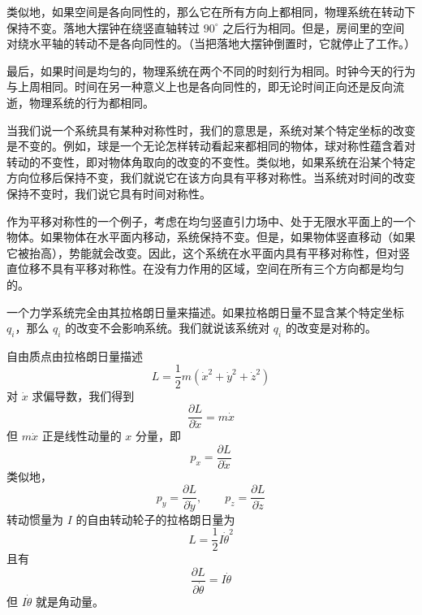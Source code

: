 类似地，如果空间是各向同性的，那么它在所有方向上都相同，物理系统在转动下保持不变。落地大摆钟在绕竖直轴转过 $90^\circ$ 之后行为相同。但是，房间里的空间对绕水平轴的转动不是各向同性的。（当把落地大摆钟倒置时，它就停止了工作。）

最后，如果时间是均匀的，物理系统在两个不同的时刻行为相同。时钟今天的行为与上周相同。时间在另一种意义上也是各向同性的，即无论时间正向还是反向流逝，物理系统的行为都相同。

当我们说一个系统具有某种对称性时，我们的意思是，系统对某个特定坐标的改变是不变的。例如，球是一个无论怎样转动看起来都相同的物体，球对称性蕴含着对转动的不变性，即对物体角取向的改变的不变性。类似地，如果系统在沿某个特定方向位移后保持不变，我们就说它在该方向具有平移对称性。当系统对时间的改变保持不变时，我们说它具有时间对称性。

作为平移对称性的一个例子，考虑在均匀竖直引力场中、处于无限水平面上的一个物体。如果物体在水平面内移动，系统保持不变。但是，如果物体竖直移动（如果它被抬高），势能就会改变。因此，这个系统在水平面内具有平移对称性，但对竖直位移不具有平移对称性。在没有力作用的区域，空间在所有三个方向都是均匀的。

一个力学系统完全由其拉格朗日量来描述。如果拉格朗日量不显含某个特定坐标 $q_i$，那么 $q_i$ 的改变不会影响系统。我们就说该系统对 $q_i$ 的改变是对称的。

自由质点由拉格朗日量描述
\begin{equation}\label{eq:1.Lfree}
L = \frac{1}{2}m(\dot{x}^2 + \dot{y}^2 + \dot{z}^2)
\end{equation}
对 $\dot{x}$ 求偏导数，我们得到
\begin{equation*}
\frac{\partial L}{\partial \dot{x}} = m\dot{x}
\end{equation*}
但 $m\dot{x}$ 正是线性动量的 $x$ 分量，即
\begin{equation*}
p_x = \frac{\partial L}{\partial \dot{x}}
\end{equation*}
类似地，
\begin{equation*}
p_y = \frac{\partial L}{\partial \dot{y}}, \qquad p_z = \frac{\partial L}{\partial \dot{z}}
\end{equation*}
转动惯量为 $I$ 的自由转动轮子的拉格朗日量为
\begin{equation*}
L = \frac{1}{2}I\dot{\theta}^2
\end{equation*}
且有
\begin{equation*}
\frac{\partial L}{\partial \dot{\theta}} = I\dot{\theta}
\end{equation*}
但 $I\dot{\theta}$ 就是角动量。

